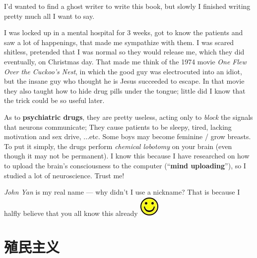 \documentclass[12pt]{report}
\newcommand{\cc}[2]{#1}
\newcommand{\cc}[2]{#2}
\newcommand*\smiley{\includegraphics[scale=0.5]{smiley.jpg}}
\begin{document}
{I'd wanted to find a ghost writer to write this book, but slowly I finished writing pretty much all I want to say.

I was locked up in a mental hospital for 3 weeks, got to know the patients and saw a lot of happenings, that made me sympathize with them.  I was scared shitless, pretended that I was normal so they would release me, which they did eventually, on Christmas day.  That made me think of the 1974 movie \textit{One Flew Over the Cuckoo's Nest}, in which the good guy was electrocuted into an idiot, but the insane guy who thought he is Jesus succeeded to escape.  In that movie they also taught how to hide drug pills under the tongue;  little did I know that the trick could be so useful later.

As to \textbf{psychiatric drugs}, they are pretty useless, acting only to \textit{block} the signals that neurons communicate;  They cause patients to be sleepy, tired, lacking motivation and sex drive, ...etc.  Some boys may become feminine / grow breasts.  To put it simply, the drugs perform \textit{chemical lobotomy} on your brain (even though it may not be permanent).  I know this because I have researched on how to upload the brain's consciousness to the computer (``\textbf{mind uploading}''), so I studied a lot of neuroscience.  Trust me!

\textit{John Yan} is my real name --- why didn't I use a nickname?  That is because I halfly believe that you all know this already \smiley
}

\chapter{\cc{殖民主义}{Colonialism}}
\end{document}
